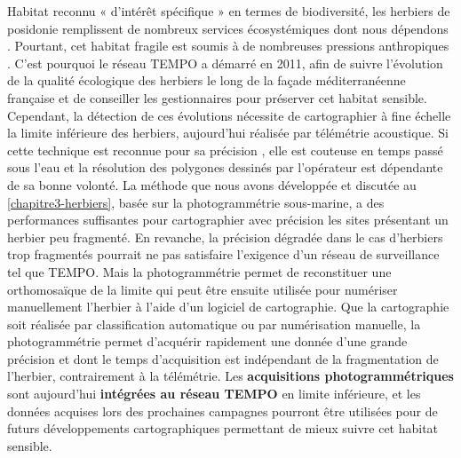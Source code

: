Habitat reconnu « d’intérêt spécifique » en termes de biodiversité, les herbiers de posidonie remplissent de nombreux services écosystémiques dont nous dépendons \citep{millenium_ecosystem_assessment_ecosystem_2005, ipbes_global_2019}. Pourtant, cet habitat fragile est soumis à de nombreuses pressions anthropiques \citep{holon_impact_2015}. C’est pourquoi le réseau TEMPO a démarré en 2011, afin de suivre l’évolution de la qualité écologique des herbiers le long de la façade méditerranéenne française et de conseiller les gestionnaires pour préserver cet habitat sensible. Cependant, la détection de ces évolutions nécessite de cartographier à fine échelle la limite inférieure des herbiers, aujourd’hui réalisée par télémétrie acoustique. Si cette technique est reconnue pour sa précision \citep{descamp_underwater_2005, descamp_fast_2011}, elle est couteuse en temps passé sous l’eau et la résolution des polygones dessinés par l’opérateur est dépendante de sa bonne volonté. La méthode que nous avons développée et discutée au \autoref{chapitre3-herbiers}, basée sur la photogrammétrie sous-marine, a des performances suffisantes pour cartographier avec précision les sites présentant un herbier peu fragmenté. En revanche, la précision dégradée dans le cas d’herbiers trop fragmentés pourrait ne pas satisfaire l’exigence d’un réseau de surveillance tel que TEMPO. Mais la photogrammétrie permet de reconstituer une orthomosaïque de la limite qui peut être ensuite utilisée pour numériser manuellement l’herbier à l’aide d’un logiciel de cartographie. Que la cartographie soit réalisée par classification automatique ou par numérisation manuelle, la photogrammétrie permet d’acquérir rapidement une donnée d’une grande précision et dont le temps d’acquisition est indépendant de la fragmentation de l’herbier, contrairement à la télémétrie. Les \textbf{acquisitions photogrammétriques} sont aujourd’hui \textbf{intégrées au réseau TEMPO} en limite inférieure, et les données acquises lors des prochaines campagnes pourront être utilisées pour de futurs développements cartographiques permettant de mieux suivre cet habitat sensible.

\medskip 

\setlength{\fboxsep}{5pt}
\setlength{\fboxrule}{0.6pt}
\noindent{}

